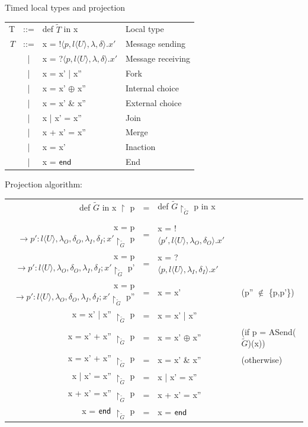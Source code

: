 \documentclass[8 pt]{beamer}
\newcommand{\kf}[1]{\textup{\textsf{#1}}\xspace}
\newcommand{\G}{\ensuremath{G}}
\newcommand{\T}{\ensuremath{T}}
\newcommand{\UT}{\ensuremath{U}}
\newcommand{\End}{\kf{end}}
\begin{document}
\begin{frame}{Timed local types and projection}
\begin{center}
\begin{tabular}{rcll}
T & ::= & def $\tilde{\T}$ in x & Local type \\
$\T$ & ::= & x  = !$\langle p,  l \langle \UT \rangle, \lambda, \delta \rangle.x' $ & Message sending\\
& | & x  = ?$\langle p,  l \langle \UT \rangle, \lambda, \delta \rangle.x' $ & Message receiving\\
& | & x = x' | x'' & Fork\\
& | & x = x' $\oplus$ x'' & Internal choice\\ 
& | & x = x' \& x'' & External choice\\
& | & x | x' = x'' & Join\\
& | & x + x' = x'' & Merge\\
& | & x = x' & Inaction\\
& | & x = $\End$ & End\\
\end{tabular}
\end{center}
Projection algorithm:\\
\begin{tabular}{rcll}
def $\tilde{\G}$ in x $\upharpoonright$ p & = & def $\tilde{\G}\upharpoonright_{\tilde{\G}}$ p in x &\\
&&&\\
x  = p $\rightarrow p' : l \langle \UT \rangle, \lambda_{O}, \delta_{O}, \lambda_{I}, \delta_{I} ;x' \upharpoonright_{\tilde{\G}}$ p & = &  x  = !$\langle p',  l \langle \UT \rangle, \lambda_{O}, \delta_{O} \rangle.x' $ &\\
x  = p $\rightarrow p' : l \langle \UT \rangle, \lambda_{O}, \delta_{O}, \lambda_{I}, \delta_{I} ;x' \upharpoonright_{\tilde{\G}}$ p' & = &  x  = ?$\langle p,  l \langle \UT \rangle, \lambda_{I}, \delta_{I} \rangle.x' $ &\\
x  = p $\rightarrow p' : l \langle \UT \rangle, \lambda_{O}, \delta_{O}, \lambda_{I}, \delta_{I} ;x' \upharpoonright_{\tilde{\G}}$ p'' & = &  x = x' &(p'' $\notin$ \{p,p'\})\\
x = x' | x'' $\upharpoonright_{\tilde{\G}}$ p & = &  x = x' | x''&\\
x = x' + x'' $\upharpoonright_{\tilde{\G}}$ p & = & x = x' $\oplus$ x'' &(if p = ASend($\tilde{\G}$)(x))\\
x = x' + x'' $\upharpoonright_{\tilde{\G}}$ p & = & x = x' \& x'' &(otherwise)\\
x | x' = x'' $\upharpoonright_{\tilde{\G}}$ p & = &  x | x' = x'' &\\
x + x' = x'' $\upharpoonright_{\tilde{\G}}$ p & = & x + x' = x'' &\\
x = $\End$ $\upharpoonright_{\tilde{\G}}$ p & = & x = $\End$ &\\
\end{tabular}
\end{frame}
\end{document}
